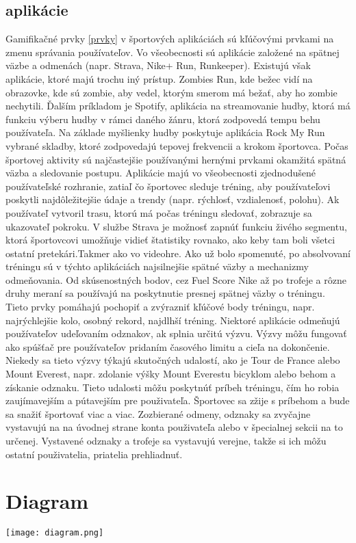 \documentclass[10pt,twoside,slovak,a4paper]{article}
\begin{document}
\subsection{aplikácie} \label{aplikácie}

Gamifikačné prvky \ref{prvky} v športových aplikáciách sú kľúčovými prvkami na zmenu správania používateľov.
Vo všeobecnosti sú aplikácie založené na spätnej väzbe a odmenách (napr. Strava, Nike+ Run, Runkeeper). 
Existujú však aplikácie, ktoré majú trochu iný prístup. Zombies Run, kde bežec vidí na obrazovke, kde sú zombie, aby vedel, ktorým smerom má bežať, aby ho zombie nechytili. 
Ďalším príkladom je Spotify, aplikácia na streamovanie hudby, ktorá má funkciu výberu hudby v rámci daného žánru, ktorá zodpovedá tempu behu používateľa.
Na základe myšlienky hudby poskytuje aplikácia Rock My Run vybrané skladby, ktoré zodpovedajú tepovej frekvencii a krokom športovca. 
Počas športovej aktivity sú najčastejšie používanými hernými prvkami okamžitá spätná väzba a sledovanie postupu. 
Aplikácie majú vo všeobecnosti zjednodušené používateľské rozhranie, zatiaľ čo športovec sleduje tréning, aby používateľovi poskytli najdôležitejšie údaje a trendy (napr. rýchlosť, vzdialenosť, polohu).
Ak používateľ vytvoril trasu, ktorú má počas tréningu sledovať, zobrazuje sa ukazovateľ pokroku. V službe Strava je možnosť zapnúť funkciu živého segmentu, ktorá športovcovi umožňuje vidieť štatistiky rovnako, ako keby tam boli všetci ostatní pretekári.Takmer ako vo videohre.
Ako už bolo spomenuté, po absolvovaní tréningu sú v týchto aplikáciách najsilnejšie spätné väzby a mechanizmy odmeňovania.
Od skúsenostných bodov, cez Fuel Score Nike až po trofeje a rôzne druhy meraní sa používajú na poskytnutie presnej spätnej väzby o tréningu. Tieto prvky pomáhajú pochopiť a zvýrazniť kľúčové body tréningu, napr. najrýchlejšie kolo, osobný rekord, najdlhší tréning.
Niektoré aplikácie odmeňujú používateľov udeľovaním odznakov, ak splnia určitú výzvu. 
Výzvy môžu fungovať ako spúšťač pre používateľov pridaním časového limitu a cieľa na dokončenie.
 Niekedy sa tieto výzvy týkajú skutočných udalostí, ako je Tour de France alebo Mount Everest, napr. zdolanie výšky Mount Everestu bicyklom alebo behom a získanie odznaku.
Tieto udalosti môžu poskytnúť príbeh tréningu, čím ho robia zaujímavejším a pútavejším pre použivateľa. Športovec sa zžije s príbehom a bude sa snažiť športovať viac a viac.
Zozbierané odmeny, odznaky sa zvyčajne vystavujú na na úvodnej strane konta použivateľa alebo v špecialnej sekcii na to určenej. Vystavené odznaky a trofeje sa vystavujú verejne, takže si ich môžu ostatní použivatelia, priatelia prehliadnuť.\cite{Effect_of_gamification-Framework}

\section{Diagram}
\texttt{[image: diagram.png]}



\end{document}
